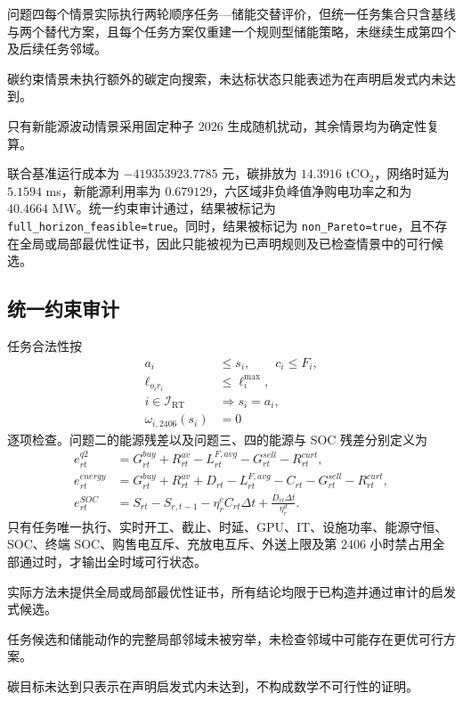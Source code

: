 \documentclass[withoutpreface,bwprint]{cumcmthesis}
\begin{document}
问题四每个情景实际执行两轮顺序任务—储能交替评价，但统一任务集合只含基线与两个替代方案，且每个任务方案仅重建一个规则型储能策略，未继续生成第四个及后续任务邻域。

碳约束情景未执行额外的碳定向搜索，未达标状态只能表述为在声明启发式内未达到。

只有新能源波动情景采用固定种子 $2026$ 生成随机扰动，其余情景均为确定性复算。

联合基准运行成本为 $-419353923.7785$ 元，碳排放为 $14.3916$ tCO$_2$，网络时延为 $5.1594$ ms，新能源利用率为 $0.679129$，六区域非负峰值净购电功率之和为 $40.4664$ MW。统一约束审计通过，结果被标记为 \texttt{full\_horizon\_feasible=true}。同时，结果被标记为 \texttt{non\_Pareto=true}，且不存在全局或局部最优性证书，因此只能被视为已声明规则及已检查情景中的可行候选。

\subsection{统一约束审计}

任务合法性按
\begin{align}
a_i&\le s_i,\qquad c_i\le F_i,\\
\ell_{o_ir_i}&\le\ell_i^{\max},\\
i\in\mathcal I_{\mathrm{RT}}&\Rightarrow s_i=a_i,\\
\omega_{i,2406}(s_i)&=0
\end{align}
逐项检查。问题二的能源残差以及问题三、四的能源与 SOC 残差分别定义为
\begin{align}
e_{rt}^{q2}
&=G_{rt}^{buy}+R_{rt}^{av}
-L_{rt}^{F,avg}-G_{rt}^{sell}-R_{rt}^{curt},\\
e_{rt}^{energy}
&=G_{rt}^{buy}+R_{rt}^{av}+D_{rt}
-L_{rt}^{F,avg}-C_{rt}-G_{rt}^{sell}-R_{rt}^{curt},\\
e_{rt}^{SOC}
&=S_{rt}-S_{r,t-1}-\eta_r^cC_{rt}\Delta t
+\frac{D_{rt}\Delta t}{\eta_r^d}.
\end{align}
只有任务唯一执行、实时开工、截止、时延、GPU、IT、设施功率、能源守恒、SOC、终端 SOC、购售电互斥、充放电互斥、外送上限及第 $2406$ 小时禁占用全部通过时，才输出全时域可行状态。

实际方法未提供全局或局部最优性证书，所有结论均限于已构造并通过审计的启发式候选。

任务候选和储能动作的完整局部邻域未被穷举，未检查邻域中可能存在更优可行方案。

碳目标未达到只表示在声明启发式内未达到，不构成数学不可行性的证明。
\end{document}
